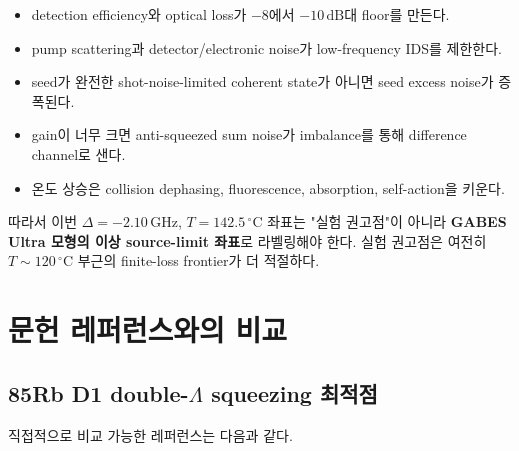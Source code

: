 \documentclass[11pt,a4paper]{article}
\newcommand{\dB}{\,\mathrm{dB}}
\newcommand{\GHz}{\,\mathrm{GHz}}
\newcommand{\degC}{\,^{\circ}\mathrm{C}}
\begin{document}
\begin{itemize}[nosep]
\item detection efficiency와 optical loss가 $-8$에서 $-10\dB$대 floor를 만든다.
\item pump scattering과 detector/electronic noise가 low-frequency IDS를 제한한다.
\item seed가 완전한 shot-noise-limited coherent state가 아니면 seed excess noise가 증폭된다.
\item gain이 너무 크면 anti-squeezed sum noise가 imbalance를 통해 difference channel로 샌다.
\item 온도 상승은 collision dephasing, fluorescence, absorption, self-action을 키운다.
\end{itemize}

따라서 이번 $\Delta=-2.10\GHz$, $T=142.5\degC$ 좌표는 "실험 권고점"이 아니라
\textbf{GABES Ultra 모형의 이상 source-limit 좌표}로 라벨링해야 한다. 실험 권고점은 여전히
$T\sim120\degC$ 부근의 finite-loss frontier가 더 적절하다.

\section{문헌 레퍼런스와의 비교}

\subsection{85Rb D1 double-$\Lambda$ squeezing 최적점}
직접적으로 비교 가능한 레퍼런스는 다음과 같다.
\end{document}
